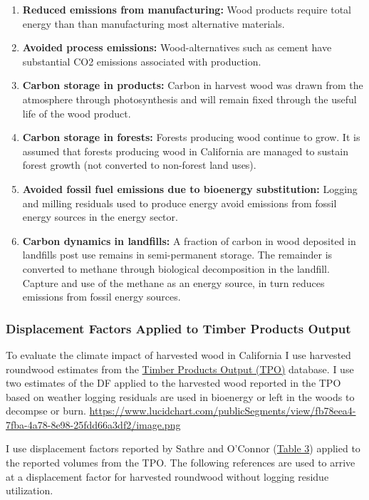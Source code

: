 \documentclass[a4paper]{article}
\begin{document}
\begin{enumerate}
\item \textbf{Reduced emissions from manufacturing:} Wood products require total
energy than than manufacturing most alternative materials.
\item \textbf{Avoided process emissions:} Wood-alternatives such as cement have
substantial CO2 emissions associated with production.
\item \textbf{Carbon storage in products:} Carbon in harvest wood was drawn from
the atmosphere through photosynthesis and will remain fixed through
the useful life of the wood product.
\item \textbf{Carbon storage in forests:} Forests producing wood continue to grow.
It is assumed that forests producing wood in California are managed
to sustain forest growth (not converted to non-forest land uses).
\item \textbf{Avoided fossil fuel emissions due to bioenergy substitution:}
Logging and milling residuals used to produce energy avoid emissions
from fossil energy sources in the energy sector.
\item \textbf{Carbon dynamics in landfills:} A fraction of carbon in wood
deposited in landfills post use remains in semi-permanent storage.
The remainder is converted to methane through biological
decomposition in the landfill. Capture and use of the methane as an
energy source, in turn reduces emissions from fossil energy sources.
\end{enumerate}

\subsubsection{Displacement Factors Applied to Timber Products Output}
\label{sec:orgheadline6}

To evaluate the climate impact of harvested wood in California I use
harvested roundwood estimates from the
\href{http://srsfia2.fs.fed.us/php/tpo_2009/tpo_rpa_int1.php}{Timber
Products Output (TPO)} database. I use two estimates of the DF applied
to the harvested wood reported in the TPO based on weather logging
residuals are used in bioenergy or left in the woods to decompse or
burn.
\url{https://www.lucidchart.com/publicSegments/view/fb78eea4-7fba-4a78-8e98-25fdd66a3df2/image.png}

I use displacement factors reported by Sathre and O'Connor
(\href{https://docs.google.com/spreadsheets/d/13UQtRfNBSJ81PXxbYSnB2LrjHePNcvhJhrsxRBjHpoY/pubhtml?gid=546564075&single=true}{Table
3}) applied to the reported volumes from the TPO. The following
references are used to arrive at a displacement factor for harvested
roundwood without logging residue utilization.
\end{document}

